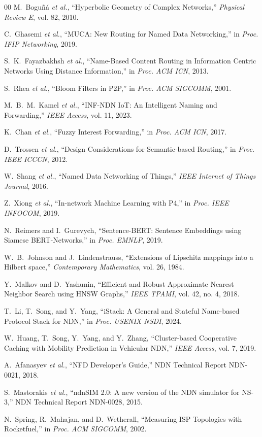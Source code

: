 \documentclass[conference]{IEEEtran}
\begin{document}
\begin{thebibliography}{00}
M.~Bogu{\~n}{\'a} \emph{et al.}, ``Hyperbolic Geometry of Complex Networks,'' \emph{Physical Review E}, vol. 82, 2010.

C.~Ghasemi \emph{et al.}, ``MUCA: New Routing for Named Data Networking,'' in \emph{Proc. IFIP Networking}, 2019.

S.~K.~Fayazbakhsh \emph{et al.}, ``Name-Based Content Routing in Information Centric Networks Using Distance Information,'' in \emph{Proc. ACM ICN}, 2013.

S.~Rhea \emph{et al.}, ``Bloom Filters in P2P,'' in \emph{Proc. ACM SIGCOMM}, 2001.

M.~B.~M.~Kamel \emph{et al.}, ``INF-NDN IoT: An Intelligent Naming and Forwarding,'' \emph{IEEE Access}, vol. 11, 2023.

K.~Chan \emph{et al.}, ``Fuzzy Interest Forwarding,'' in \emph{Proc. ACM ICN}, 2017.

D.~Trossen \emph{et al.}, ``Design Considerations for Semantic-based Routing,'' in \emph{Proc. IEEE ICCCN}, 2012.

W.~Shang \emph{et al.}, ``Named Data Networking of Things,'' \emph{IEEE Internet of Things Journal}, 2016.

Z.~Xiong \emph{et al.}, ``In-network Machine Learning with P4,'' in \emph{Proc. IEEE INFOCOM}, 2019.

N.~Reimers and I.~Gurevych, ``Sentence-BERT: Sentence Embeddings using Siamese BERT-Networks,'' in \emph{Proc. EMNLP}, 2019.

W.~B.~Johnson and J.~Lindenstrauss, ``Extensions of Lipschitz mappings into a Hilbert space,'' \emph{Contemporary Mathematics}, vol. 26, 1984.

Y.~Malkov and D.~Yashunin, ``Efficient and Robust Approximate Nearest Neighbor Search using HNSW Graphs,'' \emph{IEEE TPAMI}, vol. 42, no. 4, 2018.

T.~Li, T.~Song, and Y.~Yang, ``iStack: A General and Stateful Name-based Protocol Stack for NDN,'' in \emph{Proc. USENIX NSDI}, 2024.

W.~Huang, T.~Song, Y.~Yang, and Y.~Zhang, ``Cluster-based Cooperative Caching with Mobility Prediction in Vehicular NDN,'' \emph{IEEE Access}, vol. 7, 2019.

A.~Afanasyev \emph{et al.}, ``NFD Developer's Guide,'' NDN Technical Report NDN-0021, 2018.

S.~Mastorakis \emph{et al.}, ``ndnSIM 2.0: A new version of the NDN simulator for NS-3,'' NDN Technical Report NDN-0028, 2015.

N.~Spring, R.~Mahajan, and D.~Wetherall, ``Measuring ISP Topologies with Rocketfuel,'' in \emph{Proc. ACM SIGCOMM}, 2002.

\end{thebibliography}
\end{document}
